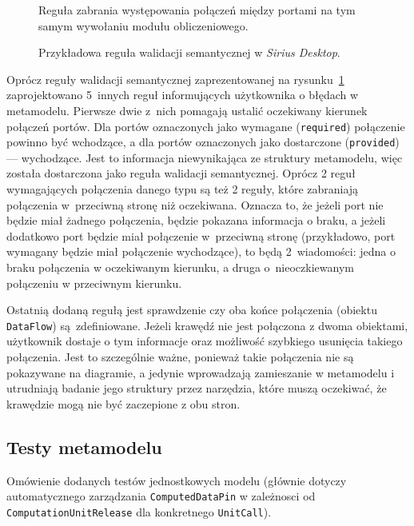 \begin{figure}
	\caption{Przykładowa reguła walidacji semantycznej w \emph{Sirius
  Desktop}.}\label{rys:sirius-desktop-example-semantic-validation-rule}
  \medskip
  {\small Reguła zabrania występowania połączeń między portami na tym samym
  wywołaniu modułu obliczeniowego.}
\end{figure}

Oprócz reguły walidacji semantycznej zaprezentowanej na
rysunku~\ref{rys:sirius-desktop-example-semantic-validation-rule}
zaprojektowano 5~innych reguł informujących użytkownika o błędach w metamodelu.
Pierwsze dwie z~nich pomagają ustalić oczekiwany kierunek połączeń portów. Dla
portów oznaczonych jako wymagane (\texttt{required}) połączenie powinno być
wchodzące, a dla portów oznaczonych jako dostarczone (\texttt{provided}) ---
wychodzące. Jest to informacja niewynikająca ze struktury metamodelu, więc
została dostarczona jako reguła walidacji semantycznej. Oprócz 2 reguł
wymagających połączenia danego typu są też 2 reguły, które zabraniają
połączenia w~przeciwną stronę niż oczekiwana. Oznacza to, że jeżeli port nie
będzie miał żadnego połączenia, będzie pokazana informacja o braku, a jeżeli
dodatkowo port będzie miał połączenie w~przeciwną stronę (przykładowo, port
wymagany będzie miał połączenie wychodzące), to będą 2~wiadomości: jedna o
braku połączenia w oczekiwanym kierunku, a druga o~nieoczkiewanym połączeniu w
przeciwnym kierunku.

Ostatnią dodaną regułą jest sprawdzenie czy oba końce połączenia (obiektu
\texttt{DataFlow}) są~zdefiniowane. Jeżeli krawędź nie jest połączona z dwoma
obiektami, użytkownik dostaje o tym informacje oraz możliwość szybkiego
usunięcia takiego połączenia. Jest to szczególnie ważne, ponieważ takie
połączenia nie są pokazywane na diagramie, a jedynie wprowadzają zamieszanie w
metamodelu i utrudniają badanie jego struktury przez narzędzia, które muszą
oczekiwać, że krawędzie mogą nie być zaczepione z obu stron.

\subsection{Testy metamodelu}

Omówienie dodanych testów jednostkowych modelu (głównie dotyczy automatycznego
zarządzania \texttt{ComputedDataPin} w zależnosci od
\texttt{ComputationUnitRelease} dla konkretnego \texttt{UnitCall}).
